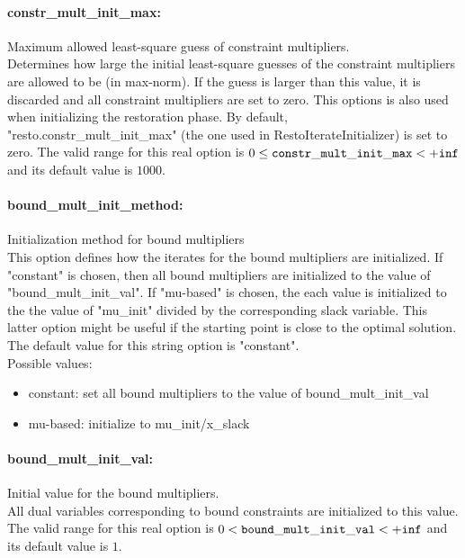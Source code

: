 \paragraph{constr\_mult\_init\_max:}\label{sec:constr_mult_init_max} Maximum allowed least-square guess of constraint multipliers. $\;$ \\
 Determines how large the initial least-square
guesses of the constraint multipliers are allowed
to be (in max-norm). If the guess is larger than
this value, it is discarded and all constraint
multipliers are set to zero.  This options is
also used when initializing the restoration
phase. By default,
"resto.constr\_mult\_init\_max" (the one used in
RestoIterateInitializer) is set to zero. The valid range for this real option is 
$0 \le {\tt constr\_mult\_init\_max } <  {\tt +inf}$
and its default value is $1000$.


\paragraph{bound\_mult\_init\_method:}\label{sec:bound_mult_init_method} Initialization method for bound multipliers $\;$ \\
 This option defines how the iterates for the
bound multipliers are initialized.  If "constant"
is chosen, then all bound multipliers are
initialized to the value of
"bound\_mult\_init\_val".  If "mu-based" is
chosen, the each value is initialized to the the
value of "mu\_init" divided by the corresponding
slack variable.  This latter option might be
useful if the starting point is close to the
optimal solution.
The default value for this string option is "constant".
\\ 
Possible values:
\begin{itemize}
   \item constant: set all bound multipliers to the value of
bound\_mult\_init\_val
   \item mu-based: initialize to mu\_init/x\_slack
\end{itemize}

\paragraph{bound\_mult\_init\_val:}\label{sec:bound_mult_init_val} Initial value for the bound multipliers. $\;$ \\
 All dual variables corresponding to bound
constraints are initialized to this value. The valid range for this real option is 
$0 <  {\tt bound\_mult\_init\_val } <  {\tt +inf}$
and its default value is $1$.


